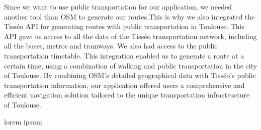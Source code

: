 Since we want to use public transportation for our application, we needed another tool than OSM to generate our routes.This is why we also integrated the Tisséo API for generating routes with public transportation in Toulouse. This API gave us access to all the data of the Tisséo transportation network, including all the buses, metros and tramways. We also had access to the public transportation timetable. This integration enabled us to generate a route at a certain time, using a combination of walking and public transportation in the city of Toulouse. By combining OSM's detailed geographical data with Tisséo's public transportation information, our application offered users a comprehensive and efficient navigation solution tailored to the unique transportation infrastructure of Toulouse. \newline


lorem ipsum
